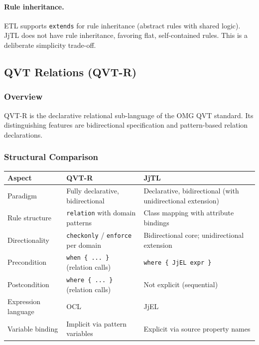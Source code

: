 \documentclass[11pt,a4paper]{article}
\newcommand{\jjel}{\textsf{JjEL}}
\newcommand{\jjtl}{\textsf{JjTL}}
\begin{document}
\paragraph{Rule inheritance.} ETL supports \texttt{extends} for rule inheritance (abstract rules with shared logic). \jjtl{} does not have rule inheritance, favoring flat, self-contained rules. This is a deliberate simplicity trade-off.


\subsection{QVT Relations (QVT-R)}

\subsubsection{Overview}

QVT-R is the declarative relational sub-language of the OMG QVT standard. Its distinguishing features are bidirectional specification and pattern-based relation declarations.

\subsubsection{Structural Comparison}

\begin{center}
\begin{tabularx}{\textwidth}{@{}lXX@{}}
\toprule
\textbf{Aspect} & \textbf{QVT-R} & \textbf{JjTL} \\
\midrule
Paradigm & Fully declarative, bidirectional & Declarative, bidirectional (with unidirectional extension) \\
Rule structure & \texttt{relation} with domain patterns & Class mapping with attribute bindings \\
Directionality & \texttt{checkonly} / \texttt{enforce} per domain & Bidirectional core; unidirectional extension \\
Precondition & \texttt{when \{ ... \}} (relation calls) & \texttt{where \{ JjEL expr \}} \\
Postcondition & \texttt{where \{ ... \}} (relation calls) & Not explicit (sequential) \\
Expression language & OCL & \jjel{} \\
Variable binding & Implicit via pattern variables & Explicit via source property names \\
\bottomrule
\end{tabularx}
\end{center}
\end{document}
